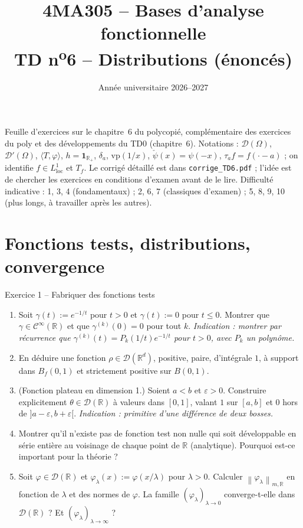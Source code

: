 \documentclass[11pt,a4paper]{article}
\title{\textbf{4MA305 -- Bases d'analyse fonctionnelle}\\[2mm]
\Large TD n\textsuperscript{o}6 -- Distributions (énoncés)}
\author{}
\date{Année universitaire 2026--2027}
\newcommand{\R}{\mathbb{R}}
\newcommand{\Bf}{B_f}
\newcommand{\norm}[1]{\left\|#1\right\|}
\newcommand{\Cinf}{\mathcal{C}^\infty}
\newcommand{\D}{\mathcal{D}}
\theoremstyle{definition}
\begin{document}
\maketitle

\begin{commentaire}
Feuille d'exercices sur le chapitre~6 du polycopié, complémentaire des exercices du poly et des développements du TD0 (chapitre~6). Notations : $\D(\Omega)$, $\D'(\Omega)$, $\langle T,\varphi\rangle$, $h=\mathbf 1_{\R_+}$, $\delta_a$, $\mathrm{vp}(1/x)$, $\check\psi(x)=\psi(-x)$, $\tau_af=f(\cdot-a)$ ; on identifie $f\in L^1_{\mathrm{loc}}$ et $T_f$. Le corrigé détaillé est dans \texttt{corrige\_TD6.pdf} ; l'idée est de chercher les exercices en conditions d'examen avant de le lire. Difficulté indicative : 1, 3, 4 (fondamentaux) ; 2, 6, 7 (classiques d'examen) ; 5, 8, 9, 10 (plus longs, à travailler après les autres).
\end{commentaire}

\section*{Fonctions tests, distributions, convergence}

\begin{exo}{Exercice 1 -- Fabriquer des fonctions tests}
\begin{enumerate}[label=(\alph*)]
  \item Soit $\gamma(t):=e^{-1/t}$ pour $t>0$ et $\gamma(t):=0$ pour $t\le0$. Montrer que $\gamma\in\Cinf(\R)$ et que $\gamma^{(k)}(0)=0$ pour tout $k$. \emph{Indication : montrer par récurrence que $\gamma^{(k)}(t)=P_k(1/t)e^{-1/t}$ pour $t>0$, avec $P_k$ un polynôme.}
  \item En déduire une fonction $\rho\in\D(\R^d)$, positive, paire, d'intégrale $1$, à support dans $\Bf(0,1)$ et strictement positive sur $B(0,1)$.
  \item (Fonction plateau en dimension 1.) Soient $a<b$ et $\varepsilon>0$. Construire explicitement $\theta\in\D(\R)$ à valeurs dans $[0,1]$, valant $1$ sur $[a,b]$ et $0$ hors de $]a-\varepsilon,b+\varepsilon[$. \emph{Indication : primitive d'une différence de deux bosses.}
  \item Montrer qu'il n'existe pas de fonction test non nulle qui soit développable en série entière au voisinage de chaque point de $\R$ (analytique). Pourquoi est-ce important pour la théorie ?
  \item Soit $\varphi\in\D(\R)$ et $\varphi_\lambda(x):=\varphi(x/\lambda)$ pour $\lambda>0$. Calculer $\norm{\varphi_\lambda}_{m,\R}$ en fonction de $\lambda$ et des normes de $\varphi$. La famille $(\varphi_\lambda)_{\lambda\to0}$ converge-t-elle dans $\D(\R)$ ? Et $(\varphi_\lambda)_{\lambda\to\infty}$ ?
\end{enumerate}
\end{exo}
\end{document}
